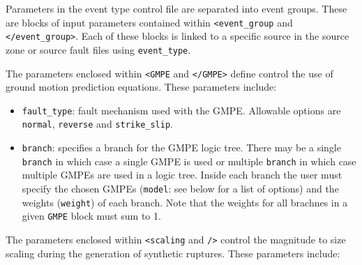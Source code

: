 Parameters in the event type control file are separated into event
groups. These are blocks of input parameters contained within
\texttt{<event\_group} and \texttt{</event\_group>}. Each of these
blocks is linked to a specific source in the source zone or source
fault files using \texttt{event\_type}.

The parameters enclosed within \texttt{<GMPE} and \texttt{</GMPE>}
define control the use of ground motion prediction equations. These
parameters include:
\begin{itemize}
\item \texttt{fault\_type}: fault mechanism used with the GMPE.
Allowable options are \texttt{normal}, \texttt{reverse} and
\texttt{strike\_slip}.
\item \texttt{branch}: specifies a branch for the GMPE logic tree.
There may be a single \texttt{branch} in which case a single GMPE is
used or multiple \texttt{branch} in which case multiple GMPEs are
used in a logic tree. Inside each branch the user must specify the
chosen GMPEs (\texttt{model}: see below for a list of options) and
the weights (\texttt{weight}) of each branch. Note that the weights
for all brachnes in a given \texttt{GMPE} block must sum to 1.
\end{itemize}

The parameters enclosed within \texttt{<scaling} and \texttt{/>}
 control the magnitude to size scaling during the generation of
 synthetic ruptures. These parameters include:


